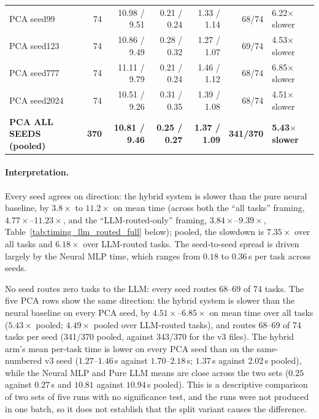 \documentclass[twoside,11pt]{article}
\begin{document}
\begin{table}[htbp]
\begin{tabular}{lrrrrrl}
PCA seed99 & 74 & 10.98 / 9.51 & 0.21 / 0.24 & 1.33 / 1.14 & 68/74 & 6.22$\times$ slower \\
PCA seed123 & 74 & 10.86 / 9.49 & 0.28 / 0.32 & 1.27 / 1.07 & 69/74 & 4.53$\times$ slower \\
PCA seed777 & 74 & 11.11 / 9.79 & 0.21 / 0.24 & 1.46 / 1.12 & 68/74 & 6.85$\times$ slower \\
PCA seed2024 & 74 & 10.51 / 9.26 & 0.31 / 0.35 & 1.39 / 1.08 & 68/74 & 4.51$\times$ slower \\
\rowcolor{black!8}
\textbf{PCA ALL SEEDS (pooled)} & \textbf{370} & \textbf{10.81 / 9.46} & \textbf{0.25 / 0.27} & \textbf{1.37 / 1.09} & \textbf{341/370} & \textbf{5.43$\times$ slower} \\
\bottomrule
\end{tabular}
\end{table}

\paragraph{Interpretation.}
Every seed agrees on direction: the hybrid system is
slower than the pure neural baseline, by $3.8\times$ to $11.2\times$ on
mean time (across both the ``all tasks'' framing, $4.77\times$--$11.23\times$,
and the ``LLM-routed-only'' framing, $3.84\times$--$9.39\times$,
Table~\ref{tab:timing_llm_routed_full} below); pooled, the slowdown is
$7.35\times$ over all tasks and $6.18\times$ over LLM-routed tasks. The seed-to-seed spread is driven
largely by the Neural MLP time, which ranges from $0.18$ to $0.36$\,s per task
across seeds. 

No seed routes zero tasks to the LLM: every seed routes 68--69 of 74 tasks.
The five PCA rows show the same direction: the hybrid system is slower than the neural
baseline on every PCA seed, by $4.51\times$--$6.85\times$ on mean time over all tasks
($5.43\times$ pooled; $4.49\times$ pooled over LLM-routed tasks), and routes 68--69 of 74
tasks per seed (341/370 pooled, against 343/370 for the v3 files). The hybrid arm's mean
per-task time is lower on every PCA seed than on the same-numbered v3 seed ($1.27$--$1.46$\,s
against $1.70$--$2.18$\,s; $1.37$\,s against $2.02$\,s pooled), while the Neural MLP and
Pure LLM means are close across the two sets ($0.25$ against $0.27$\,s and $10.81$ against
$10.94$\,s pooled). This is a descriptive comparison of two sets of five runs with no
significance test, and the runs were not produced in one batch, so it does not establish
that the split variant causes the difference.
\end{document}
